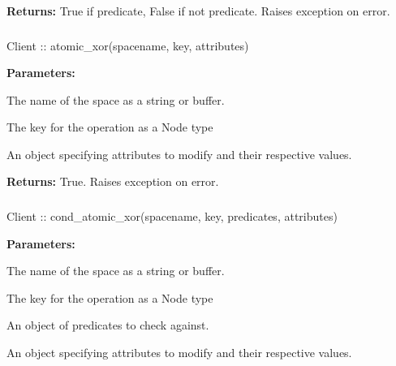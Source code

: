 \noindent\textbf{Returns:}
True if predicate, False if not predicate.  Raises exception on error.

\subsubsection{}
\label{api:nodejs:atomic_xor}
\begin{javascriptcode}
Client :: atomic_xor(spacename, key, attributes)
\end{javascriptcode}
\funcdesc 

\noindent\textbf{Parameters:}
\begin{description}[labelindent=\widthof{{\code{attributes}}},leftmargin=*,noitemsep,nolistsep,align=right]
\item[\code{spacename}] The name of the space as a string or buffer.
\item[\code{key}] The key for the operation as a Node type
\item[\code{attributes}] An object specifying attributes to modify and their respective values.
\end{description}

\noindent\textbf{Returns:}
True.  Raises exception on error.

\subsubsection{}
\label{api:nodejs:cond_atomic_xor}
\begin{javascriptcode}
Client :: cond_atomic_xor(spacename, key, predicates, attributes)
\end{javascriptcode}
\funcdesc 

\noindent\textbf{Parameters:}
\begin{description}[labelindent=\widthof{{\code{predicates}}},leftmargin=*,noitemsep,nolistsep,align=right]
\item[\code{spacename}] The name of the space as a string or buffer.
\item[\code{key}] The key for the operation as a Node type
\item[\code{predicates}] An object of predicates to check against.
\item[\code{attributes}] An object specifying attributes to modify and their respective values.
\end{description}

